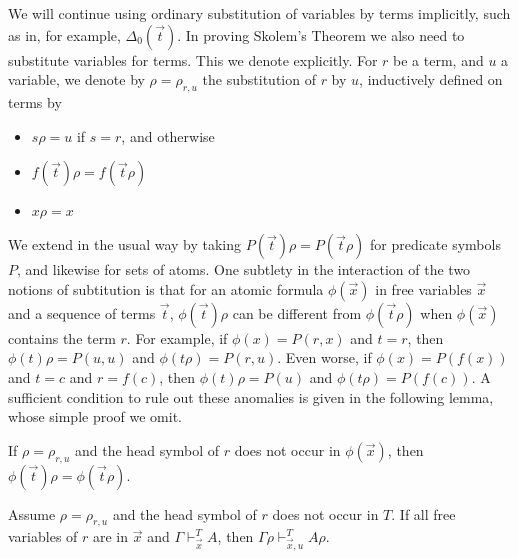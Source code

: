 \documentclass[10pt,a4paper]{article}
\begin{document}
We will continue using ordinary substitution of variables by terms implicitly, such as in,
for example, $\Delta_0(\vec{t})$. In proving Skolem's Theorem we also need to
substitute variables for terms. This we denote explicitly.
For $r$ be a term, and $u$ a variable, we denote by $\rho = \rho_{r,u}$ the 
substitution of $r$ by $u$, inductively defined on terms by
\begin{itemize}
\item $s\rho = u$ if $s = r$, and otherwise
\item $f(\vec{t})\rho = f(\vec{t}\rho)$
\item $x\rho = x$
\end{itemize}
We extend in the usual way by taking $P(\vec{t})\rho = P(\vec{t}\rho)$ for
predicate symbols  $P$, and likewise for sets of atoms. 
One subtlety in the interaction of the two notions of subtitution is that for an
atomic formula $\phi(\vec{x})$ in free variables $\vec{x}$ and
a sequence of terms $\vec{t}$, $\phi(\vec{t})\rho$
can be different from $\phi(\vec{t}\rho)$ when $\phi(\vec{x})$
contains the term $r$. For example, if  $\phi(x) = P(r,x)$
and $t=r$, then $\phi(t)\rho = P(u,u)$ and $\phi(t\rho) = P(r,u)$.
Even worse, if $\phi(x) = P(f(x))$ and $t=c$ and $r=f(c)$,
then $\phi(t)\rho = P(u)$ and $\phi(t\rho) = P(f(c))$.
A sufficient condition to rule out these anomalies is given in
the following lemma, whose simple proof we omit.

\begin{lemma}\label{subst0}
If $\rho = \rho_{r,u}$ and the head symbol of $r$ does not occur in 
$\phi(\vec{x})$, then $\phi(\vec{t})\rho =\phi(\vec{t}\rho)$.
\end{lemma}

\begin{lemma}\label{subst2}
Assume $\rho = \rho_{r,u}$ and the head symbol of $r$ does not occur in $T$.
If all free variables of $r$ are in $\vec{x}$ and
$\Gamma\vdash_{\vec{x}}^T A$, then $\Gamma\rho\vdash_{\vec{x},u}^T A\rho$.
\end{lemma}
\end{document}
